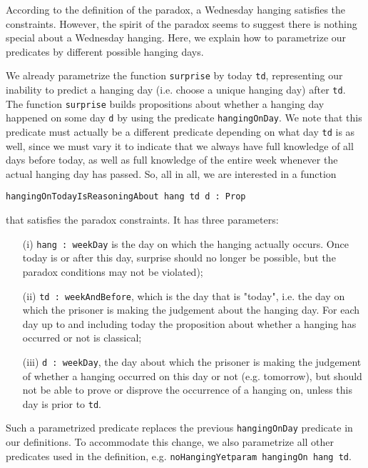 \documentclass[runningheads]{llncs}
\begin{document}
According to the definition of the paradox, a Wednesday hanging satisfies
the constraints. However, the spirit of the paradox seems to suggest there is nothing
special about a Wednesday hanging. Here, we explain how to parametrize our predicates
by different possible hanging days.

We already parametrize the function {\tt surprise} by today {\tt td},
representing our inability to predict a hanging day (i.e. choose a unique hanging day)
after {\tt td}. The function {\tt surprise} builds propositions
about whether a hanging day happened on some day {\tt d} by using the
predicate {\tt hangingOnDay}. We note that this predicate must actually be a different
predicate depending on what day {\tt td} is as well, since we must vary it to
indicate that we always have full knowledge of all days before today, as well as full
knowledge of the entire week whenever the actual hanging day has passed.
So, all in all, we are interested in a function \newline

{\tt hangingOnTodayIsReasoningAbout hang td d : Prop} \newline

that satisfies the paradox constraints. It has three parameters:

\begin{itemize}
  \item[(i)] {\tt hang : weekDay} is the day on which the hanging actually occurs.
  Once today is or after this day, surprise should no longer be possible, but the paradox
  conditions may not be violated);
  \item[(ii)] {\tt td : weekAndBefore}, which is the day that is "today", i.e. the day
  on which the prisoner is making the judgement about the hanging day. For each day up to and including today
  the proposition about whether a hanging has occurred or not is classical;
  \item[(iii)] {\tt d : weekDay}, the day about which the prisoner is making the judgement of whether a hanging occurred on this day or not (e.g.
  tomorrow), but should not be able to prove or disprove the occurrence of a hanging on,
  unless this day is prior to {\tt td}.
\end{itemize}

Such a parametrized predicate replaces the previous {\tt hangingOnDay} predicate
in our definitions.
To accommodate this change, we also parametrize all
other predicates used in the definition, e.g. {\tt noHangingYetparam hangingOn hang td}.
\end{document}
